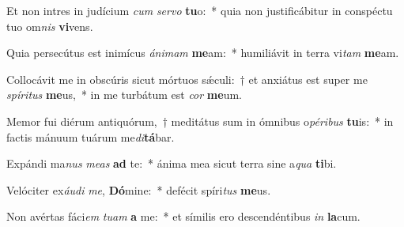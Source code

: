 \item Et non intres in judícium \textit{cum} \textit{ser}\textit{vo} \textbf{tu}o:~* quia non justificábitur in conspéctu tuo om\textit{nis} \textbf{vi}vens.
\item Quia persecútus est inimícus \textit{á}\textit{ni}\textit{mam} \textbf{me}am:~* humiliávit in terra vi\textit{tam} \textbf{me}am.
\item Collocávit me in obscúris sicut mórtuos sǽculi:~† et anxiátus est super me \textit{spí}\textit{ri}\textit{tus} \textbf{me}us,~* in me turbátum est \textit{cor} \textbf{me}um.
\item Memor fui diérum antiquórum,~† meditátus sum in ómnibus o\textit{pé}\textit{ri}\textit{bus} \textbf{tu}is:~* in factis mánuum tuárum me\textit{di}\textbf{tá}bar.
\item Expándi ma\textit{nus} \textit{me}\textit{as} \textbf{ad} te:~* ánima mea sicut terra sine a\textit{qua} \textbf{ti}bi.
\item Velóciter ex\textit{áu}\textit{di} \textit{me}, \textbf{Dó}mine:~* defécit spíri\textit{tus} \textbf{me}us.
\item Non avértas fáci\textit{em} \textit{tu}\textit{am} \textbf{a} me:~* et símilis ero descendéntibus \textit{in} \textbf{la}cum.
